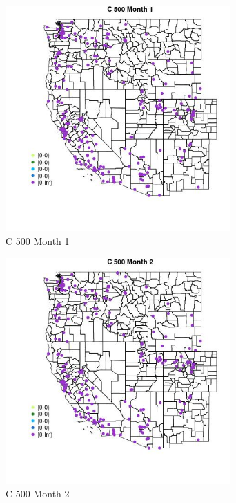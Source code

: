 \begin{figure} 
\centering  
\includegraphics[width=0.77\textwidth]{Code_Outputs/Report_ML_input_PM25_Step4_part_e_de_duplicated_aveswNAs_MapObsMo1C_500.jpg} 
\caption{\label{fig:Report_ML_input_PM25_Step4_part_e_de_duplicated_aveswNAsMapObsMo1C_500}C 500 Month 1} 
\end{figure} 
 

\begin{figure} 
\centering  
\includegraphics[width=0.77\textwidth]{Code_Outputs/Report_ML_input_PM25_Step4_part_e_de_duplicated_aveswNAs_MapObsMo2C_500.jpg} 
\caption{\label{fig:Report_ML_input_PM25_Step4_part_e_de_duplicated_aveswNAsMapObsMo2C_500}C 500 Month 2} 
\end{figure} 
 

